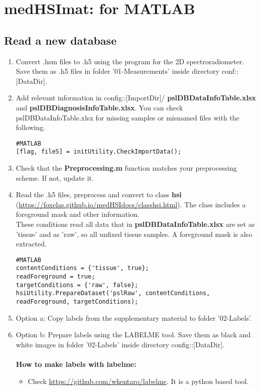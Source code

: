 \documentclass{foxelas_report}
\begin{document}
\section{medHSImat: for MATLAB}

\subsection{Read a new database}
\begin{enumerate}
\item Convert .hsm files to .h5 using the program for the 2D spectroradiometer. Save them as .h5 files in folder '01-Measurements' inside directory conf::[DataDir]. 


\item Add relevant information in config::[ImportDir]/ \textbf{pslDBDataInfoTable.xlsx} and \textbf{pslDBDiagnosisInfoTable.xlsx}. You can check pslDBDataInfoTable.xlsx for missing samples or misnamed files with the following. 
\begin{lstlisting}
#MATLAB
[flag, fileS] = initUtility.CheckImportData();
\end{lstlisting}

\item Check that the \textbf{Preprocessing.m} function matches your preprocessing scheme. If not, update it. 


\item Read the .h5 files, preprocess and convert to class \textbf{hsi} (\url{https://foxelas.github.io/medHSIdocs/classhsi.html}). The class includes a foreground mask and other information. \\

These conditions read all data that in \textbf{pslDBDataInfoTable.xlsx} are set as 'tissue' and as 'raw', so all unfixed tissue samples. A foreground mask is also extracted. 

\begin{lstlisting}
#MATLAB
contentConditions = {'tissue', true};
readForeground = true;
targetConditions = {'raw', false};
hsiUtility.PrepareDataset('pslRaw', contentConditions, readForeground, targetConditions);
\end{lstlisting}


\item Option a: Copy labels from the supplementary material to folder '02-Labels'.

\item Option b: Prepare labels using the LABELME tool. Save them as black and white images in folder '02-Labels' inside directory config::[DataDir]. \\
\\
\textbf{How to make labels with labelme: 
}\begin{itemize}
\item Check  \url{https://github.com/wkentaro/labelme}. It is a python based tool.


\end{itemize}
\end{enumerate}
\end{document}
